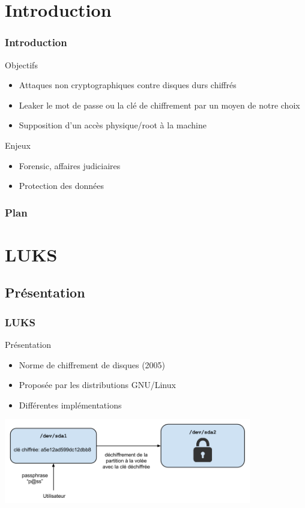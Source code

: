 \documentclass[red]{beamer}
\begin{document}
\section{Introduction}
\begin{frame}
    \frametitle{Introduction}
    \begin{block}{Objectifs}
        \begin{itemize}
            \item Attaques non cryptographiques contre disques durs
            chiffrés
            \item Leaker le mot de passe ou la clé de chiffrement par
            un moyen de notre choix
            \item Supposition d'un accès physique/root à la machine
        \end{itemize}
    \end{block}
    \begin{block}{Enjeux}
        \begin{itemize}
            \item Forensic, affaires judiciaires
            \item Protection des données
        \end{itemize}
    \end{block}
\end{frame}

\begin{frame}
    \frametitle{Plan}
    \tableofcontents
\end{frame}

\section{LUKS}
\subsection{Présentation}
\begin{frame}
    \frametitle{LUKS}
    \begin{block}{Présentation}
        \begin{itemize}
            \item Norme de chiffrement de disques (2005)
            \item Proposée par les distributions GNU/Linux
            \item Différentes implémentations
        \end{itemize}
    \end{block}
    \centering
    \includegraphics[width=10.8cm]{img/luks_principe.png}
\end{frame}
\end{document}
